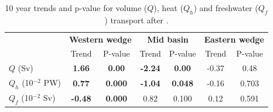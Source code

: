 \begin{table}
	\caption{10 year trends and p-value for volume ($ Q $), heat ($ Q_{h} $) and freshwater ($ Q_{f} $) transport after \citep{Hamed1998}.}
	\begin{tabular}{|l|cc|cc|cc|}
		\hline
		& \multicolumn{2}{c|}{\textbf{Western wedge}} & \multicolumn{2}{c|}{\textbf{Mid basin}} & \multicolumn{2}{c|}{\textbf{Eastern wedge}} \\
		& Trend & P-value & Trend & P-value & Trend & P-value \\
		\hline
		$Q$ (Sv) & \textbf{1.66} & \textbf{0.00} & \textbf{-2.24} & \textbf{0.00} & -0.37 & 0.48 \\
		$Q_h$ (10$^{-2}$ PW) & \textbf{0.77} & \textbf{0.000} & \textbf{-1.04} & \textbf{0.048} & -0.16 & 0.703 \\
		$Q_f$ (10$^{-2}$ Sv) & \textbf{-0.48} & \textbf{0.000} & 0.82 & 0.100 & 0.12 & 0.591 \\
		\hline
	\end{tabular}
\end{table}